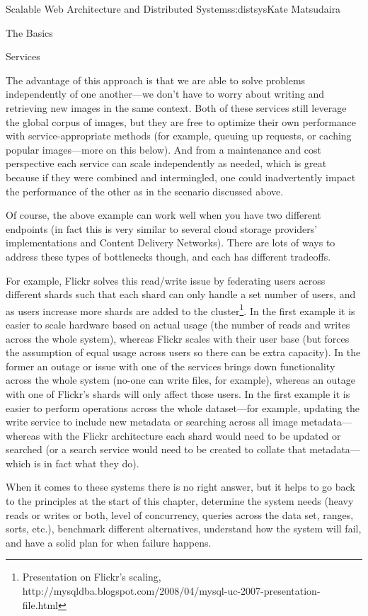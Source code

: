 \begin{aosachapter}{Scalable Web Architecture and Distributed Systems}{s:distsys}{Kate Matsudaira}
\begin{aosasect1}{The Basics}
\begin{aosasect2}{Services}

The advantage of this approach is that we are able to solve 
problems independently of one another---we don't have to worry about
writing and retrieving new images in the same context. Both of
these services still leverage the global corpus of images, but they
are free to optimize their own performance with service-appropriate
methods
(for example, queuing up requests, or caching
popular images---more on this below). And from a maintenance and cost
perspective each service can scale independently as needed, which is
great because if they were combined and intermingled, one could
inadvertently impact the performance of the other as in the scenario
discussed above.

Of course, the above example can work well when you have two different
endpoints (in fact this is very similar to several cloud storage
providers' implementations and Content Delivery Networks). There are
lots of ways to address these types of bottlenecks though, and each
has different tradeoffs.

For example, Flickr solves this read/write issue by federating users
across different shards such that each shard can only handle a set
number of users, and as users increase more shards are added to the
cluster\footnote{Presentation on Flickr's scaling,
  http://mysqldba.blogspot.com/2008/04/mysql-uc-2007-presentation-file.html}. In
the first example it is easier to scale hardware based on actual usage
(the number of reads and writes across the whole system), whereas
Flickr scales with their user base (but forces the assumption of equal
usage across users so there can be extra capacity). In the former an
outage or issue with one of the services brings down functionality
across the whole system (no-one can write files, for example), whereas
an outage with one of Flickr's shards will only affect those users. In
the first example it is easier to perform operations across the whole
dataset---for example, updating the write service to include new
metadata or searching across all image metadata---whereas with the
Flickr architecture each shard would need to be updated or searched
(or a search service would need to be created to collate that
metadata---which is in fact what they do).

When it comes to these systems there is no right answer, but it helps
to go back to the principles at the start of this chapter, determine
the system needs (heavy reads or writes or both, level of concurrency,
queries across the data set, ranges, sorts, etc.), benchmark different
alternatives, understand how the system will fail, and have a solid plan
for when failure happens.


\end{aosasect2}
\end{aosasect1}
\end{aosachapter}
